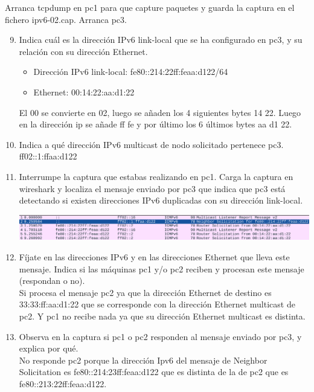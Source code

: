 \documentclass[12pt, a4paper]{report}
\begin{document}
Arranca tcpdump en pc1 para que capture paquetes y guarda la captura en el fichero ipv6-02.cap.
Arranca pc3.
\begin{enumerate}
	\setcounter{enumi}{8}
	\item Indica cuál es la dirección IPv6 link-local que se ha configurado en pc3, y su relación con su
	dirección Ethernet.
		\begin{itemize}
		\item Dirección IPv6 link-local: fe80::214:22ff:feaa:d122/64
		\item Ethernet: 00:14:22:aa:d1:22
	\end{itemize}
	El 00 se convierte en 02, luego se añaden los 4 siguientes bytes 14 22. Luego en la dirección ip se añade ff fe y por último los 6 últimos bytes aa d1 22.
	\item Indica a qué dirección IPv6 multicast de nodo solicitado pertenece pc3.\\
	ff02::1:ffaa:d122
	\item Interrumpe la captura que estabas realizando en pc1. Carga la captura en wireshark y localiza
	el mensaje enviado por pc3 que indica que pc3 está detectando si existen direcciones IPv6
	duplicadas con su dirección link-local.
\begin{center}
		\includegraphics[width=1\textwidth]{ej11_1_1}
\end{center}
	\item Fíjate en las direcciones IPv6 y en las direcciones Ethernet que lleva este mensaje. Indica si
	las máquinas pc1 y/o pc2 reciben y procesan este mensaje (respondan o no).\\
	
	Si procesa el mensaje pc2 ya que la dirección Ethernet de destino es 33:33:ff:aa:d1:22 que se corresponde con la dirección Ethernet multicast de pc2. Y pc1 no recibe nada ya que su dirección Ethernet multicast es distinta.
	\item Observa en la captura si pc1 o pc2 responden al mensaje enviado por pc3, y explica por qué.\\
	
	No responde pc2 porque la dirección Ipv6 del mensaje de Neighbor Solicitation es fe80::214:23ff:feaa:d122 que es distinta de la de pc2 que es fe80::213:22ff:feaa:d122.
\end{enumerate}
\end{document}
